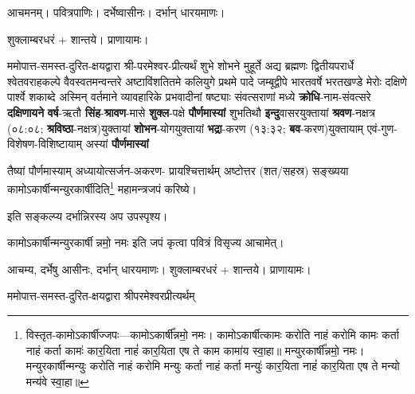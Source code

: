 
\setlength{\parindent}{0pt}

\newcommand{\sep}{\hspace{-0.5ex}{\small$\circ$}\hspace{0.5ex}}
\newcommand{\yutithyadi}{\textbf{क्रोधि}-नाम-संवत्सरे    \textbf{दक्षिणायने} \textbf{वर्ष}-ऋतौ   \textbf{सिंह}-\textbf{श्रावण}-मासे  \textbf{शुक्ल}-पक्षे    \textbf{पौर्णमास्यां} शुभतिथौ   \textbf{इन्दु}\-वासर\-युक्तायां \textbf{श्रवण}-नक्षत्र (०८:०८; \textbf{श्रविष्ठा}-नक्षत्र)\-युक्तायां   \textbf{शोभन}-योग\-युक्तायां    \textbf{भद्रा}-करण (१३:३२; \textbf{बव}-करण)\-युक्तायाम् एवं-गुण-विशेषण-विशिष्टायाम्     अस्यां \textbf{पौर्णमास्यां}}
\newcommand{\instruct}[2]{#1}
\begingroup


आचमनम्। पवित्रपाणिः। दर्भेष्वासीनः। दर्भान् धारयमाणः।

शुक्लाम्बरधरं + शान्तये। प्राणायामः।

ममोपात्त-समस्त-दुरित-क्षयद्वारा श्री-परमेश्वर-प्रीत्यर्थं शुभे शोभने मुहूर्ते अद्य ब्रह्मणः
द्वितीयपरार्धे श्वेतवराहकल्पे वैवस्वतमन्वन्तरे अष्टाविंशतितमे कलियुगे प्रथमे पादे
जम्बूद्वीपे भारतवर्षे भरतखण्डे मेरोः दक्षिणे पार्श्वे शकाब्दे अस्मिन् वर्तमाने व्यावहारिके
 प्रभवादीनां षष्ट्याः संवत्सराणां मध्ये
\yutithyadi

तैष्यां पौर्णमास्याम् अध्यायोत्सर्जन-अकरण- प्रायश्चित्तार्थम् अष्टोत्तर (शत/सहस्र) सङ्ख्यया कामोऽकार्षीन्मन्युरकार्षीदिति\footnote{विस्तृत-कामोऽकार्षीज्जपः---कामोऽकार्\mbox{}षी᳚न्नमो॒ नमः। 
 कामोऽकार्\mbox{}षीत्कामः करोति नाहं करोमि कामः कर्ता नाहं कर्ता कामः॑ कार॒यिता नाहं॑ कार॒यिता एष ते काम कामा॑य स्वा॒हा॥ मन्युरकार्\mbox{}षी᳚न्नमो॒ नमः। 
मन्युरकार्\mbox{}षीन्मन्युः करोति नाहं करोमि मन्युः कर्ता नाहं कर्ता मन्युः॑ कार॒यिता नाहं॑ कार॒यिता एष ते मन्यो मन्य॑वे स्वा॒हा॥} महा\-मन्त्र\-जपं करिष्ये।

\instruct{इति सङ्कल्प्य दर्भान्निरस्य अप उपस्पृश्य।}{என்று ஸங்கல்பம் செய்து கொண்டு தர்பைகளை கீழே போட்டுவிட்டு ஜலத்தை தொடவும்.}

\instruct{कामोऽकार्षीन्मन्युरकार्षीन्नमो॒  नमः  इति जपं कृत्वा पवित्रं विसृज्य आचामेत्।}{காமோகார்ஷீத் மன்யுரகார்ஷீன்னமோ நம: என்று ஜபித்து முடிவில் ப்ராணாயாமம் செய்து உபஸ்தானம் செய்யவும். பவித்ரத்தை விஸர்ஜனம் செய்து ஆசமனம் செய்யவும்.}


आचम्य, दर्भेषु आसीनः, दर्भान् धारयमाणः। शुक्लाम्बरधरं + शान्तये। प्राणायामः।

ममोपात्त-समस्त-दुरित-क्षयद्वारा श्रीपरमेश्वरप्रीत्यर्थम्

